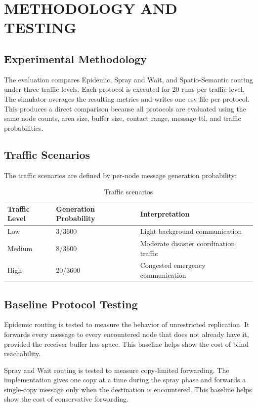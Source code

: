 \chapter{\MakeUppercase{Methodology and Testing}}

\section{Experimental Methodology}
The evaluation compares Epidemic, Spray and Wait, and Spatio-Semantic routing under three traffic levels. Each protocol is executed for 20 runs per traffic level. The simulator averages the resulting metrics and writes one \ac{csv} file per protocol. This produces a direct comparison because all protocols are evaluated using the same node counts, area size, buffer size, contact range, message \ac{ttl}, and traffic probabilities.

\section{Traffic Scenarios}
The traffic scenarios are defined by per-node message generation probability:

\begin{table}[h!]
	\centering
	\caption{Traffic scenarios}
	\renewcommand{\arraystretch}{1.3}
	\begin{tabular}{|l|l|l|}
		\hline
		\textbf{Traffic Level} & \textbf{Generation Probability} & \textbf{Interpretation} \\
		\hline
		Low & 3/3600 & Light background communication \\
		\hline
		Medium & 8/3600 & Moderate disaster coordination traffic \\
		\hline
		High & 20/3600 & Congested emergency communication \\
		\hline
	\end{tabular}
	\label{tab:traffic_scenarios}
\end{table}

\section{Baseline Protocol Testing}
Epidemic routing is tested to measure the behavior of unrestricted replication. It forwards every message to every encountered node that does not already have it, provided the receiver buffer has space. This baseline helps show the cost of blind reachability.

Spray and Wait routing is tested to measure copy-limited forwarding. The implementation gives one copy at a time during the spray phase and forwards a single-copy message only when the destination is encountered. This baseline helps show the cost of conservative forwarding.

